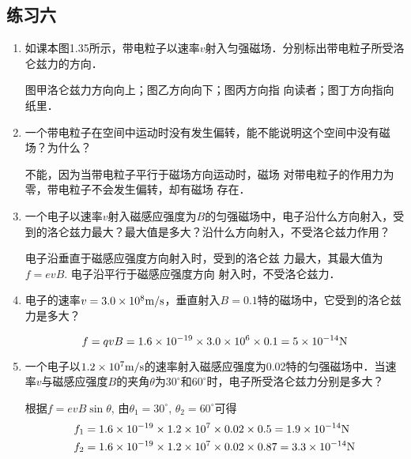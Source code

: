 \subsection{练习六}

\begin{enumerate}
    \item 如课本图1.35所示，带电粒子以速率$v$射入匀强磁场．分别标出带电粒子所受洛仑兹力的方向．	


    \begin{solution}
        图甲洛仑兹力方向向上；图乙方向向下；图丙方向指
        向读者；图丁方向指向纸里．
    \end{solution}
    
    \item 一个带电粒子在空间中运动时没有发生偏转，能不能说明这个空间中没有磁场？为什么？


    \begin{solution}
        不能，因为当带电粒子平行于磁场方向运动时，磁场
        对带电粒子的作用力为零，带电粒子不会发生偏转，却有磁场
        存在．
    \end{solution}
    
    \item 一个电子以速率$v$射入磁感应强度为$B$的匀强磁场中，电子沿什么方向射入，受到的洛仑兹力最大？最大值是多大？沿什么方向射入，不受洛仑兹力作用？


    \begin{solution}
        电子沿垂直于磁感应强度方向射入时，受到的洛仑兹
        力最大，其最大值为$f=evB$. 电子沿平行于磁感应强度方向
        射入时，不受洛仑兹力．
    \end{solution}
    
    \item 电子的速率$v=3.0\times10^8\text{m}/\text{s}$，垂直射入$B=0.1$特的磁场中，它受到的洛仑兹力是多大？


    \begin{solution}
    \[f=qvB=1.6\times10^{-19}\times3.0\times10^6\times0.1=5\times10^{-14}{\rm N}\]
    \end{solution}
    
    \item 一个电子以$1.2\times10^7\text{m}/\text{s}$的速率射入磁感应强度为0.02特的匀强磁场中．当速率$v$与磁感应强度$B$的夹角$\theta$为$30^{\circ}$和$60^{\circ}$时，电子所受洛仑兹力分别是多大？


    \begin{solution}
        根据$f=evB\sin\theta$, 由$\theta_1=30^{\circ}$, $\theta_2=60^{\circ}$可得
   \[\begin{split}
       f_1&=1.6\times10^{-19}\times1.2\times10^7\times0.02\times0.5=1.9\times10^{-14}{\rm N}\\
        f_2&=1.6\times10^{-19}\times1.2\times10^7\times0.02\times0.87=3.3\times10^{-14}{\rm N}
   \end{split}\]     
    \end{solution}
    

\end{enumerate}
